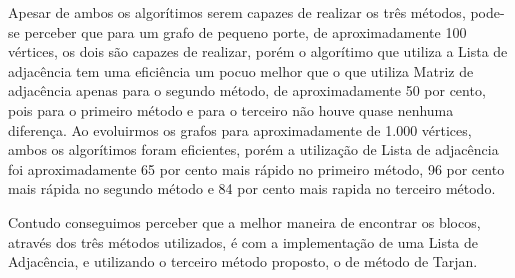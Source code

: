 Apesar de ambos os algorítimos serem capazes de realizar os três métodos, pode-se perceber que para um grafo de pequeno porte, de aproximadamente 100 vértices, os dois são capazes de realizar, porém o algorítimo que utiliza a Lista de adjacência tem uma eficiência um pocuo melhor que o que utiliza Matriz de adjacência apenas para o segundo método, de aproximadamente 50 por cento, pois para o primeiro método e para o terceiro não houve quase nenhuma diferença. 
Ao evoluirmos os grafos para aproximadamente de 1.000 vértices, ambos os algorítimos foram eficientes, porém a utilização de Lista de adjacência foi aproximadamente 65 por cento mais rápido no primeiro método, 96 por cento mais rápida no segundo método e 84 por cento mais rapida no terceiro método. 

Contudo conseguimos perceber que a melhor maneira de encontrar os blocos, através dos três métodos utilizados, é com a implementação de uma Lista de Adjacência, e utilizando o terceiro método proposto, o de método de Tarjan.


